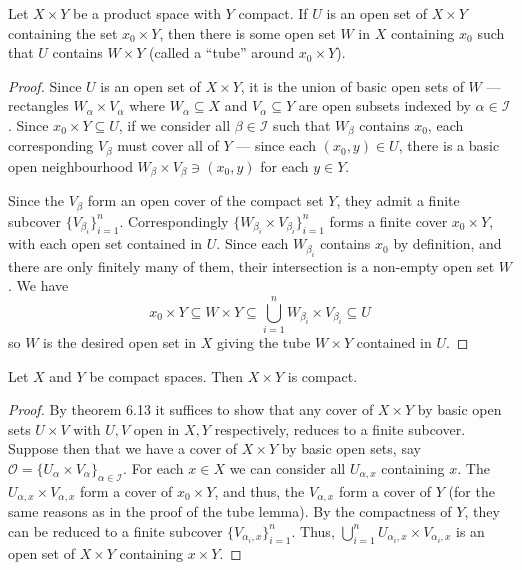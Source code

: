 \documentclass[12 pt, letterpaper]{hmcpset}
\begin{document}
\begin{solution}
	\begin{theorem}
		Let $X \times Y$ be a product space with $Y$ compact. If $U$ is an open set of $X \times Y$ containing the set $x_{0} \times Y$, then there is some open set $W$ in $X$ containing $x_{0}$ such that $U$ contains $W \times Y$ (called a ``tube'' around $x_{0} \times Y$).
	\end{theorem}

	\begin{proof}
		Since $U$ is an open set of $X \times Y$, it is the union of basic open sets of $W$ --- rectangles $W_{\alpha} \times V_{\alpha}$ where $W_{\alpha} \subseteq X$ and $V_{\alpha} \subseteq Y$ are open subsets indexed by $\alpha \in \mathcal{I}$. Since $x_{0} \times Y \subseteq U$, if we consider all $\beta \in \mathcal{I}$ such that $W_{\beta}$ contains $x_{0}$, each corresponding $V_{\beta}$ must cover all of $Y$ --- since each $(x_{0}, y) \in U$, there is a basic open neighbourhood $W_{\beta} \times V_{\beta} \ni (x_{0}, y)$ for each $y \in Y$.

		Since the $V_{\beta}$ form an open cover of the compact set $Y$, they admit a finite subcover $\{ V_{\beta_{i}} \}_{i = 1}^{n}$. Correspondingly $\{ W_{\beta_{i}} \times V_{\beta_{i}} \}_{i = 1}^{n}$ forms a finite cover $x_{0} \times Y$, with each open set contained in $U$. Since each $W_{\beta_{i}}$ contains $x_{0}$ by definition, and there are only finitely many of them, their intersection is a non-empty open set $W$. We have
		\[
			x_{0} \times Y \subseteq W \times Y \subseteq \bigcup_{i = 1}^{n} W_{\beta_{i}} \times V_{\beta_{i}} \subseteq U
		\]
		so $W$ is the desired open set in $X$ giving the tube $W \times Y$ contained in $U$.
	\end{proof}

	\begin{theorem}[6.19]
		Let $X$ and $Y$ be compact spaces. Then $X \times Y$ is compact.
	\end{theorem}

	\begin{proof}
		By theorem 6.13 it suffices to show that any cover of $X \times Y$ by basic open sets $U \times V$ with $U, V$ open in $X, Y$ respectively, reduces to a finite subcover. Suppose then that we have a cover of $X \times Y$ by basic open sets, say $\mathcal{O} = \{ U_{\alpha} \times V_{\alpha} \}_{\alpha \in \mathcal{I}}$. For each $x \in X$ we can consider all $U_{\alpha, x}$ containing $x$. The $U_{\alpha, x} \times V_{\alpha, x}$ form a cover of $x_{0} \times Y$, and thus, the $V_{\alpha, x}$ form a cover of $Y$ (for the same reasons as in the proof of the tube lemma). By the compactness of $Y$, they can be reduced to a finite subcover $\{ V_{\alpha_{i}, x} \}_{i = 1}^{n}$. Thus, $\bigcup_{i = 1}^{n} U_{\alpha_{i}, x} \times V_{\alpha_{i}, x}$ is an open set of $X \times Y$ containing $x \times Y$.


\end{proof}
\end{solution}
\end{document}
